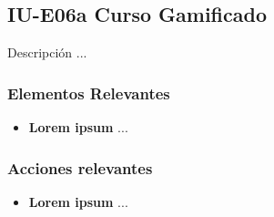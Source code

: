 
\subsection{IU-E06a Curso Gamificado}

 Descripción ...


\subsubsection{Elementos Relevantes}

    \begin{itemize}
    \item {\bf Lorem ipsum}
        ...
    \end{itemize}

\subsubsection{Acciones relevantes}

    \begin{itemize}
    \item {\bf Lorem ipsum}
        ...
    \end{itemize}

\clearpage
